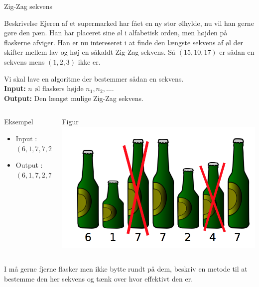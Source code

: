 \documentclass[12pt,t]{beamer}
\begin{document}
    \begin{frame}[plain]{Zig-Zag sekvens}
        \begin{block}{Beskrivelse}
          Ejeren af et supermarked har fået en ny stor ølhylde, nu vil han gerne
          gøre den pæn. Han har placeret sine øl i alfabetisk orden, men højden
          på flaskerne afviger. Han er nu intereseret i at finde den længste
          sekvens af øl der skifter mellem lav og høj en såkaldt Zig-Zag sekvens.
          Så $(15,10,17)$ er sådan en sekvens mens $(1,2,3)$ ikke er.

          Vi skal lave en algoritme der bestemmer sådan en sekvens.\\
          \textbf{Input:} $n$ øl flaskers højde $n_1, n_2, \dots$. \\
          \textbf{Output:} Den længst mulige Zig-Zag sekvens.
        \end{block}
    \end{frame}

    \begin{frame}
      \begin{columns}
          \begin{column}{0.5\textwidth}
              \begin{block}{Eksempel}
                \begin{itemize}
                    \item Input : $(6, 1, 7, 7, 2, 4, 7)$
                    \item Output : $(6,1,7,2,7)$
                \end{itemize}
              \end{block}
          \end{column}
          \begin{column}{0.5\textwidth}
              \begin{block}{Figur}
                \includegraphics[scale=0.3]{oel.png}
              \end{block}
          \end{column}
      \end{columns}
        I må gerne fjerne flasker men ikke bytte rundt på dem, beskriv en metode
        til at bestemme den her sekvens og tænk over hvor effektivt den er.
    \end{frame}
\end{document}
